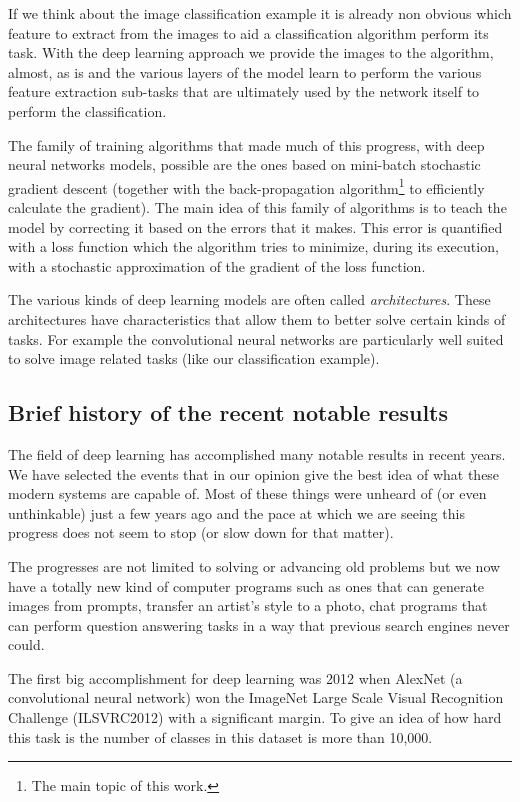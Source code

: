 \documentclass{sapthesis}
\begin{document}
If we think about the image classification example it is already non obvious
which feature to extract from the images to aid a classification algorithm
perform its task. With the deep learning approach we provide the images to the
algorithm, almost, as is and the various layers of the model learn to perform
the various feature extraction sub-tasks that are ultimately used by the
network itself to perform the classification.

The family of training algorithms that made much of this progress, with deep
neural networks models, possible are the ones based on mini-batch stochastic
gradient descent (together with the back-propagation algorithm\footnote{The main
topic of this work.} to efficiently calculate the gradient). The main idea of
this family of algorithms is to teach the model by correcting it based on the
errors that it makes. This error is quantified with a loss function which the
algorithm tries to minimize, during its execution, with a stochastic
approximation of the gradient of the loss function.

The various kinds of deep learning models are often called \emph{architectures}.
These architectures have characteristics that allow them to better solve certain
kinds of tasks. For example the convolutional neural networks are particularly
well suited to solve image related tasks (like our classification example).

\subsection{Brief history of the recent notable results}
\label{sec:notable_results}

The field of deep learning has accomplished many notable results in recent
years. We have selected the events that in our opinion give the best idea of
what these modern systems are capable of. Most of these things were unheard of
(or even unthinkable) just a few years ago and the pace at which we are seeing
this progress does not seem to stop (or slow down for that matter).

The progresses are not limited to solving or advancing old problems but we now
have a totally new kind of computer programs such as ones that can generate
images from prompts, transfer an artist's style to a photo, chat programs that
can perform question answering tasks in a way that previous search engines never
could.

The first big accomplishment for deep learning was 2012 when AlexNet (a
convolutional neural network) won the ImageNet Large Scale Visual Recognition
Challenge (ILSVRC2012) with a significant margin. To give an idea of how hard
this task is the number of classes in this dataset is more than 10,000.
\end{document}
